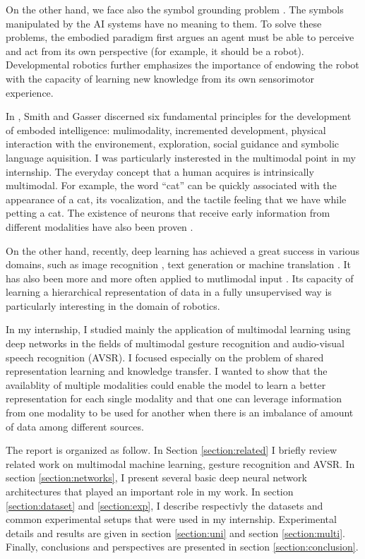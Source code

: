 On the other hand, we face also the symbol grounding problem
\cite{S. Harnad 1990}. The symbols manipulated by the AI systems have
no meaning to them. To solve these problems, the embodied paradigm
\cite{A. Clark 1997} first argues an agent must be able to perceive and
act from its own perspective (for example, it should be a robot).
Developmental robotics \cite{J. Weng 2001} further emphasizes the
importance of endowing the robot with the capacity of learning new
knowledge from its own sensorimotor experience.

In \cite{L. Smith 2005}, Smith and Gasser discerned six fundamental
principles for the development of emboded intelligence: mulimodality,
incremented development, physical interaction with the environement,
exploration, social guidance and symbolic language aquisition.
I was particularly insterested in the multimodal point in my internship.
The everyday concept that a human acquires is intrinsically multimodal.
For example, the word ``cat'' can be quickly associated with the
appearance of a cat, its vocalization, and the tactile feeling that
we have while petting a cat. The existence of neurons that receive
early information from different modalities have also been proven
\cite{S. Molholm 2002}.

On the other hand, recently, deep learning has achieved a great success in
various domains, such as image recognition \cite{A. Krizhevsky 2012},
text generation \cite{A. Graves 2013} or
machine translation \cite{I. Sutskever 2014}.
It has also been more and more often applied to mutlimodal input
\cite{J. Ngiam 2011, T. Baltrusaitis 2017}.
Its capacity of learning a hierarchical representation of data in a
fully unsupervised way \cite{P. Vincent 2010, A. Radford 2015}
is particularly interesting in the domain of robotics.

In my internship, I studied mainly the application of multimodal learning
using deep networks in the fields of multimodal gesture recognition
and audio-visual speech recognition (AVSR).
I focused especially on the problem
of shared representation learning and knowledge transfer. I wanted to show
that the availablity of multiple modalities could enable the model
to learn a better representation for each single modality and that one can
leverage information from one modality to be used for another when there
is an imbalance of amount of data among different sources.

The report is organized as follow. In Section \ref{section:related} I
briefly review related work on multimodal machine learning, gesture
recognition and AVSR. In section \ref{section:networks}, I present
several basic deep neural network architectures that played an important
role in my work. In section \ref{section:dataset} and
\ref{section:exp}, I describe respectivly the datasets and common
experimental setups that were used in my internship. Experimental
details and results are given in section \ref{section:uni} and
section \ref{section:multi}. Finally, conclusions and perspectives are
presented in section \ref{section:conclusion}.

